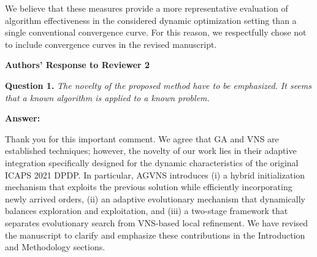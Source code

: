 \documentclass[11pt]{article}
\newcommand{\question}[2]{\vspace{0.5em}\noindent\textbf{Question #1.} \emph{#2}\par}
\newcommand{\answer}{\noindent\textbf{Answer:}\par}
\begin{document}
We believe that these measures provide a more representative evaluation of algorithm effectiveness in the considered dynamic optimization setting than a single conventional convergence curve. For this reason, we respectfully chose not to include convergence curves in the revised manuscript.

\newpage
\begin{center}
\textbf{\Large Authors' Response to Reviewer 2}
\end{center}

\question{1}{The novelty of the proposed method have to be emphasized. It seems that a known algorithm is applied to a known problem.}
\answer Thank you for this important comment. We agree that GA and VNS are established techniques; however, the novelty of our work lies in their adaptive integration specifically designed for the dynamic characteristics of the original ICAPS 2021 DPDP. In particular, AGVNS introduces (i) a hybrid initialization mechanism that exploits the previous solution while efficiently incorporating newly arrived orders, (ii) an adaptive evolutionary mechanism that dynamically balances exploration and exploitation, and (iii) a two-stage framework that separates evolutionary search from VNS-based local refinement. We have revised the manuscript to clarify and emphasize these contributions in the Introduction and Methodology sections.
\end{document}
